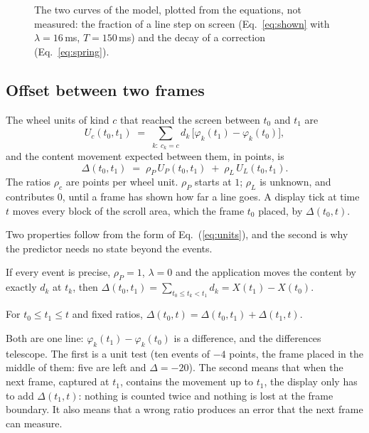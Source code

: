 \begin{figure}[t]
\centering

\caption{The two curves of the model, plotted from the equations, not measured: the fraction of a line step on screen
(Eq.~\ref{eq:shown} with $\lambda=16$\,ms, $T=150$\,ms) and the decay of a correction (Eq.~\ref{eq:spring}).}\label{fig:curves}
\end{figure}

\subsection{Offset between two frames}

The wheel units of kind $c$ that reached the screen between $t_0$ and $t_1$ are
\begin{equation}\label{eq:units}
U_c(t_0,t_1)\;=\;\sum_{k:\ c_k=c} d_k\,\bigl[\varphi_k(t_1)-\varphi_k(t_0)\bigr],
\end{equation}
and the content movement expected between them, in points, is
\begin{equation}\label{eq:offset}
\Delta(t_0,t_1)\;=\;\rho_P\,U_P(t_0,t_1)\;+\;\rho_L\,U_L(t_0,t_1).
\end{equation}
The ratios $\rho_c$ are points per wheel unit. $\rho_P$ starts at $1$; $\rho_L$ is unknown, and contributes $0$, until a frame has shown
how far a line goes. A display tick at time $t$ moves every block of the scroll area, which the frame $t_0$ placed, by $\Delta(t_0,t)$.

Two properties follow from the form of Eq.~(\ref{eq:units}), and the second is why the predictor needs no state beyond the
events.

\begin{proposition}\label{prop:exact}
If every event is precise, $\rho_P=1$, $\lambda=0$ and the application moves the content by exactly $d_k$ at $t_k$, then
$\Delta(t_0,t_1)=\sum_{t_0\le t_k<t_1}d_k=X(t_1)-X(t_0)$.
\end{proposition}

\begin{proposition}[Re-basing]\label{prop:rebase}
For $t_0\le t_1\le t$ and fixed ratios, $\Delta(t_0,t)=\Delta(t_0,t_1)+\Delta(t_1,t)$.
\end{proposition}

\noindent Both are one line: $\varphi_k(t_1)-\varphi_k(t_0)$ is a difference, and the differences telescope. The first is a unit
test (ten events of $-4$ points, the frame placed in the middle of them: five are left and $\Delta=-20$). The second means that when
the next frame, captured at $t_1$, contains the movement up to $t_1$, the display only has to add $\Delta(t_1,t)$: nothing is
counted twice and nothing is lost at the frame boundary. It also means that a wrong ratio produces an error that the next frame
can measure.

